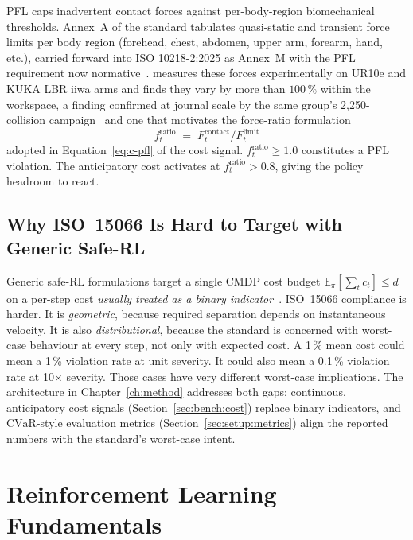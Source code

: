 \documentclass[11pt,a4paper]{report}
\newcommand{\pfl}{PFL}
\newcommand{\iso}{ISO~15066}
\newcommand{\cvar}{\ensuremath{\mathrm{CVaR}}}
\begin{document}
\pfl{} caps inadvertent contact forces against per-body-region
biomechanical thresholds. Annex~A of the standard tabulates
quasi-static and transient force limits per body region
(forehead, chest, abdomen, upper arm, forearm, hand, etc.), carried
forward into ISO 10218-2:2025 as Annex~M with the \pfl{} requirement
now normative~\cite{hartmann2026iso}.
\cite{svarny2020collision} measures these forces experimentally on
UR10e and KUKA LBR iiwa arms and finds they vary by more than
$100\,\%$ within the workspace, a finding confirmed at journal scale
by the same group's 2{,}250-collision campaign~\cite{svarny2022softskins}
and one that motivates the force-ratio formulation
\begin{equation}
  f^{\mathrm{ratio}}_t \;=\; F^{\mathrm{contact}}_t /
                              F^{\mathrm{limit}}_t
  \label{eq:iso-pfl-ratio}
\end{equation}
adopted in Equation~\ref{eq:c-pfl} of the cost signal.
$f^{\mathrm{ratio}}_t \ge 1.0$ constitutes a \pfl{} violation. The
anticipatory cost activates at $f^{\mathrm{ratio}}_t > 0.8$, giving
the policy headroom to react.

\subsection{Why \iso{} Is Hard to Target with Generic Safe-RL}
\label{sec:bg:iso:hard}

Generic safe-RL formulations target a single CMDP cost budget
$\mathbb{E}_{\pi}[\sum_t c_t] \le d$ on a per-step cost
\emph{usually treated as a binary indicator}~\cite{ray2019safetygym,
stooke2020pid,ji2023safetygymnasium}.
\iso{} compliance is harder. It is \emph{geometric}, because required
separation depends on instantaneous velocity. It is also
\emph{distributional}, because the standard is concerned with
worst-case behaviour at every step, not only with expected cost. A
1\,\% mean cost could mean a 1\,\% violation rate at unit severity. It
could also mean a 0.1\,\% violation rate at 10$\times$ severity. Those
cases have very different worst-case implications.
The architecture in Chapter~\ref{ch:method} addresses both gaps:
continuous, anticipatory cost signals
(Section~\ref{sec:bench:cost}) replace binary indicators, and
\cvar-style evaluation metrics (Section~\ref{sec:setup:metrics})
align the reported numbers with the standard's worst-case intent.

\section{Reinforcement Learning Fundamentals}
\label{sec:bg:rl}
\end{document}
